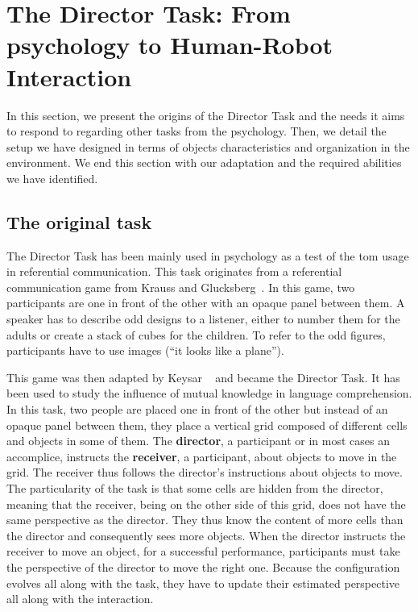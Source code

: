 \documentclass[a4paper,11pt,twoside]{StyleThese}
\begin{document}
\section{The Director Task: From psychology to Human-Robot Interaction}

In this section, we present the origins of the Director Task and the needs it aims to respond to regarding other tasks from the psychology. Then, we detail the setup we have designed in terms of objects characteristics and organization in the environment. We end this section with our adaptation and the required abilities we have identified.

\subsection{The original task}\label{chap9:subsec:psycho}

The Director Task has been mainly used in psychology as a test of the \acrfull{tom} usage in referential communication. This task originates from a referential communication game from Krauss and Glucksberg~\cite{krauss_1977_social}. In this game, two participants are one in front of the other with an opaque panel between them. A speaker has to describe odd designs to a listener, either to number them for the adults or create a stack of cubes for the children. To refer to the odd figures, participants have to use images (\eg ``it looks like a plane'').

This game was then adapted by Keysar \etal~\cite{keysar_2000_taking} and became the Director Task. It has been used to study the influence of mutual knowledge in language comprehension. In this task, two people are placed one in front of the other but instead of an opaque panel between them, they place a vertical grid composed of different cells and objects in some of them. The \textbf{director}, a participant or in most cases an accomplice, instructs the \textbf{receiver}, a participant, about objects to move in the grid. The receiver thus follows the director's instructions about objects to move. The particularity of the task is that some cells are hidden from the director, meaning that the receiver, being on the other side of this grid, does not have the same perspective as the director. They thus know the content of more cells than the director and consequently sees more objects. When the director instructs the receiver to move an object, for a successful performance, participants must take the perspective of the director to move the right one. Because the configuration evolves all along with the task, they have to update their estimated perspective all along with the interaction.
\end{document}
